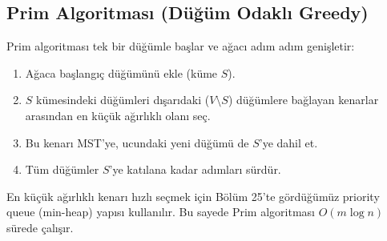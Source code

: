 \subsection{Prim Algoritması (Düğüm Odaklı Greedy)}
Prim algoritması tek bir düğümle başlar ve ağacı adım adım genişletir:
\begin{enumerate}
    \item Ağaca başlangıç düğümünü ekle (küme $S$).
    \item $S$ kümesindeki düğümleri dışarıdaki ($V \setminus S$) düğümlere bağlayan kenarlar arasından en küçük ağırlıklı olanı seç.
    \item Bu kenarı MST'ye, ucundaki yeni düğümü de $S$'ye dahil et.
    \item Tüm düğümler $S$'ye katılana kadar adımları sürdür.
\end{enumerate}
En küçük ağırlıklı kenarı hızlı seçmek için Bölüm 25'te gördüğümüz priority queue (min-heap) yapısı kullanılır. Bu sayede Prim algoritması $O(m \log n)$ sürede çalışır.

